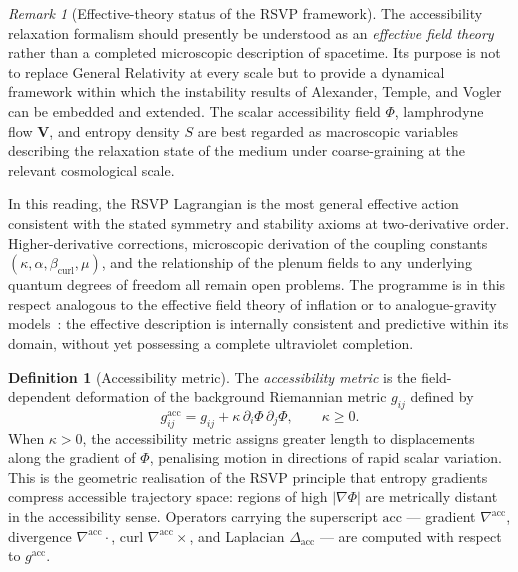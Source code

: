 \documentclass[12pt,a4paper]{article}
\theoremstyle{plain}
\theoremstyle{definition}
\newtheorem{definition}[theorem]{Definition}
\theoremstyle{remark}
\newtheorem{remark}[theorem]{Remark}
\newcommand{\nabacc}{\nabla^{\!\mathrm{acc}}}
\newcommand{\Delacc}{\Delta_{\mathrm{acc}}}
\newcommand{\bcurl}{\beta_{\mathrm{curl}}}
\begin{document}
\begin{remark}[Effective-theory status of the RSVP framework]
\label{rem:eft_status}
The accessibility relaxation formalism should presently be understood as an
\emph{effective field theory} rather than a completed microscopic description
of spacetime. Its purpose is not to replace General Relativity at every scale
but to provide a dynamical framework within which the instability results of
Alexander, Temple, and Vogler can be embedded and extended. The scalar
accessibility field $\Phi$, lamphrodyne flow $\mathbf{V}$, and entropy density
$S$ are best regarded as macroscopic variables describing the relaxation state
of the medium under coarse-graining at the relevant cosmological scale.

In this reading, the RSVP Lagrangian is the most general effective action
consistent with the stated symmetry and stability axioms at two-derivative order.
Higher-derivative corrections, microscopic derivation of the coupling constants
$(\kappa, \alpha, \bcurl, \mu)$, and the relationship of the plenum fields to
any underlying quantum degrees of freedom all remain open problems. The programme
is in this respect analogous to the effective field theory of inflation or to
analogue-gravity models~\cite{MisnerThorneWheeler1973,HawkingEllis1973}: the
effective description is internally consistent and predictive within its domain,
without yet possessing a complete ultraviolet completion.
\end{remark}

\begin{definition}[Accessibility metric]
\label{def:acc_metric}
The \emph{accessibility metric} is the field-dependent deformation of the
background Riemannian metric $g_{ij}$ defined by
\begin{equation}
  g^{\mathrm{acc}}_{ij} = g_{ij} + \kappa\,\partial_i\Phi\,\partial_j\Phi,
  \qquad \kappa \geq 0.
  \label{eq:acc_metric}
\end{equation}
When $\kappa > 0$, the accessibility metric assigns greater length to
displacements along the gradient of $\Phi$, penalising motion in directions of
rapid scalar variation. This is the geometric realisation of the RSVP principle
that entropy gradients compress accessible trajectory space: regions of high
$|\nabla\Phi|$ are metrically distant in the accessibility sense. Operators
carrying the superscript $\mathrm{acc}$ --- gradient $\nabacc$, divergence
$\nabla^{\!\mathrm{acc}}\cdot$, curl $\nabacc\times$, and Laplacian $\Delacc$ ---
are computed with respect to $g^{\mathrm{acc}}$.
\end{definition}
\end{document}
